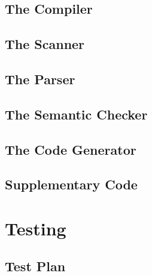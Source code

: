 \documentclass{article}
\begin{document}
\subsection{The Compiler}

\subsection{The Scanner}

\subsection{The Parser}

\subsection{The Semantic Checker}

\subsection{The Code Generator}

\subsection{Supplementary Code} %


\newpage

\section{Testing}

\subsection{Test Plan}

\newpage
\end{document}
